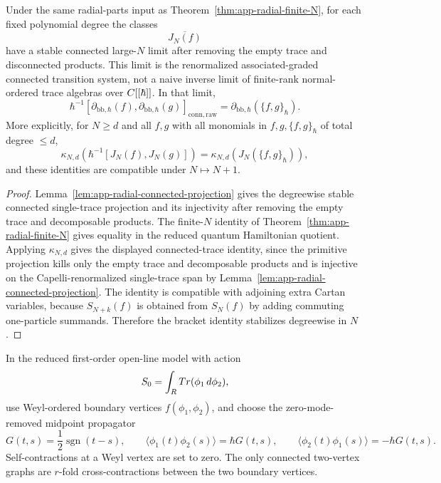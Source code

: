 \begin{thm}
\label{cor:app-radial-stable-connected}
  Under the same radial-parts input as
  Theorem~\ref{thm:app-radial-finite-N}, for each fixed polynomial
  degree the classes
  \[
    \overline{J_N(f)}
  \]
  have a stable connected large-\(N\) limit after removing the empty
  trace and disconnected products.  This limit is the renormalized
  associated-graded connected transition system, not a naive inverse
  limit of finite-rank normal-ordered trace algebras over
  \(C[[\hbar]]\).  In that limit,
  \[
    \hbar^{-1}[\partial_{\mathrm{bb},\hbar}(f),
      \partial_{\mathrm{bb},\hbar}(g)]_{\mathrm{conn,raw}}
      =
      \partial_{\mathrm{bb},\hbar}(\{f,g\}_\hbar).
  \]
  More explicitly, for \(N\geq d\) and all \(f,g\) with all monomials
  in \(f,g,\{f,g\}_\hbar\) of total degree \(\leq d\),
  \[
    \kappa_{N,d}\!\left(
      \hbar^{-1}[J_N(f),J_N(g)]
    \right)
    =
    \kappa_{N,d}\!\left(
      J_N(\{f,g\}_\hbar)
    \right),
  \]
  and these identities are compatible under \(N\mapsto N+1\).
\end{thm}

\begin{proof}
  Lemma~\ref{lem:app-radial-connected-projection} gives the
  degreewise stable connected single-trace projection and its
  injectivity after removing the empty trace and decomposable products.
  The finite-\(N\) identity of
  Theorem~\ref{thm:app-radial-finite-N} gives equality in the reduced
  quantum Hamiltonian quotient.  Applying \(\kappa_{N,d}\) gives the
  displayed connected-trace identity, since the primitive projection
  kills only the empty trace and decomposable products and is injective
  on the Capelli-renormalized single-trace span by
  Lemma~\ref{lem:app-radial-connected-projection}.  The identity is
  compatible with adjoining extra Cartan variables, because
  \(S_{N+k}(f)\) is obtained from \(S_N(f)\) by adding commuting
  one-particle summands.  Therefore the bracket identity stabilizes
  degreewise in \(N\).
\end{proof}

\begin{defn}
\label{def:app-reduced-open-line-wick-graph-data}
  In the reduced first-order open-line model with action
  \[
    S_0=\int_{R}Tr(\phi_1\,d\phi_2),
  \]
  use Weyl-ordered boundary vertices \(f(\phi_1,\phi_2)\), and choose
  the zero-mode-removed midpoint propagator
  \[
    G(t,s)=\frac12\operatorname{sgn}(t-s),\qquad
    \langle\phi_1(t)\phi_2(s)\rangle=\hbar G(t,s),\qquad
    \langle\phi_2(t)\phi_1(s)\rangle=-\hbar G(t,s).
  \]
  Self-contractions at a Weyl vertex are set to zero.  The only
  connected two-vertex graphs are \(r\)-fold cross-contractions between
  the two boundary vertices.
\end{defn}

